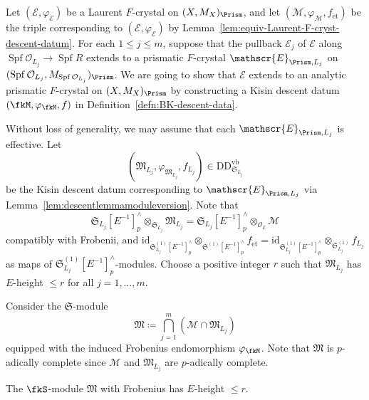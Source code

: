 Let $(\mathscr{E}, \varphi_{\mathscr{E}})$ be a Laurent $F$-crystal on $(X, M_X)_{\Prism}$, and let $(\mathcal{M}, \varphi_{\mathcal{M}}, f_{\mathrm{\acute{e}t}})$ be the triple corresponding to $(\mathscr{E}, \varphi_{\mathscr{E}})$ by Lemma~\ref{lem:equiv-Laurent-F-cryst-descent-datum}. For each $1 \leq j \leq m$, suppose that the pullback $\mathscr{E}_j$ of $\mathscr{E}$ along $\operatorname{Spf} \mathcal{O}_{L_j} \rightarrow \operatorname{Spf} R$ extends to a prismatic $F$-crystal $\mathscr{E}_{\Prism, L_j}$ on $(\operatorname{Spf} \mathcal{O}_{L_j}, M_{\operatorname{Spf} \mathcal{O}_{L_j}})_{\Prism}$. We are going to show that $\mathscr{E}$ extends to an analytic prismatic $F$-crystal on $(X, M_X)_{\Prism}$ by constructing a Kisin descent datum $(\fkM,\varphi_\fkM,f)$ in Definition~\ref{defn:BK-descent-data}. 

Without loss of generality, we may assume that each $\mathscr{E}_{\Prism, L_j}$ is effective. Let 
\[
(\mathfrak{M}_{L_j}, \varphi_{\mathfrak{M}_{L_j}}, f_{L_j}) \in \mathrm{DD}_{\mathfrak{S}_{L_j}}^{\mathrm{vb}}
\]
be the Kisin descent datum corresponding to $\mathscr{E}_{\Prism, L_j}$ via Lemma~\ref{lem:descentlemmamoduleversion}. Note that 
\[
\mathfrak{S}_{L_j}[E^{-1}]^{\wedge}_p\otimes_{\mathfrak{S}_{L_j}} \mathfrak{M}_{L_j} = \mathfrak{S}_{L_j}[E^{-1}]^{\wedge}_p\otimes_{\mathcal{O}_{\mathcal{E}}} \mathcal{M} 
\]  
compatibly with Frobenii, and $\mathrm{id}_{\mathfrak{S}_{L_j}^{(1)}[E^{-1}]^{\wedge}_p}\otimes_{\mathfrak{S}^{(1)}[E^{-1}]^{\wedge}_p} f_{\mathrm{\acute{e}t}} = \mathrm{id}_{\mathfrak{S}_{L_j}^{(1)}[E^{-1}]^{\wedge}_p}\otimes_{\mathfrak{S}_{L_j}^{(1)}} f_{L_j}$ as maps of $\mathfrak{S}_{L_j}^{(1)}[E^{-1}]^{\wedge}_p$-modules. Choose a positive integer $r$ such that $\mathfrak{M}_{L_j}$ has $E$-height $\leq r$ for all $j = 1, \ldots, m$.

Consider the $\mathfrak{S}$-module
\[
\mathfrak{M} \coloneqq \bigcap_{j=1}^m (\mathcal{M}\cap \mathfrak{M}_{L_j})
\]
equipped with the induced Frobenius endomorphism $\varphi_\fkM$. Note that $\mathfrak{M}$ is $p$-adically complete since $\mathcal{M}$ and $\mathfrak{M}_{L_j}$ are $p$-adically complete.

\begin{prop} \label{prop:E-height}
The $\fkS$-module $\mathfrak{M}$ with Frobenius has $E$-height $\leq r$.
\end{prop}


